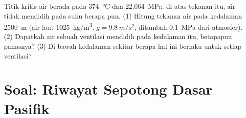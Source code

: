 \begin{exercise}[$\star\star\star$]\label{exo:g11:ocean-ridges:15}
Titik kritis air berada pada \qty{374}{\celsius} dan \qty{22.064}{MPa}: di atas
tekanan itu, air tidak mendidih pada suhu berapa pun. (1) Hitung tekanan air
pada kedalaman \qty{2500}{m} (air laut \qty{1025}{kg/m^3},
$g = \qty{9.8}{m/s^2}$, ditambah \qty{0.1}{MPa} dari atmosfer). (2) Dapatkah air
sebuah ventilasi mendidih pada kedalaman itu, betapapun panasnya? (3) Di bawah
kedalaman sekitar berapa hal ini berlaku untuk setiap ventilasi?
\end{exercise}

\section{Soal: Riwayat Sepotong Dasar Pasifik}


